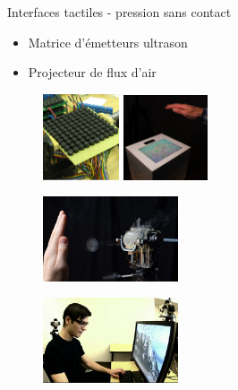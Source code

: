 \documentclass[compress, noflama]{beamer}
\begin{document}
\begin{frame}{Interfaces tactiles - pression sans contact}
\begin{multicols}{2}

\begin{itemize}
\item Matrice d'émetteurs ultrason
\item Projecteur de flux d'air
\end{itemize}

\begin{figure}
\centering
\includegraphics[width=2.25cm]{images/ultrahaptics}
\includegraphics[width=2.5cm]{images/ultrahaptics_project_photo}
\caption{\cite{Alexander2011}}
\end{figure}


\begin{figure}
\centering
\includegraphics[width=4cm]{images/AIREALVortexRingFig}
\end{figure}
\vspace{-1.5cm}
\begin{figure}
\includegraphics[width=4cm]{images/aireal2}
\caption{\cite{Sodhi2013}}
\end{figure}

\end{multicols}
\end{frame}
\end{document}
